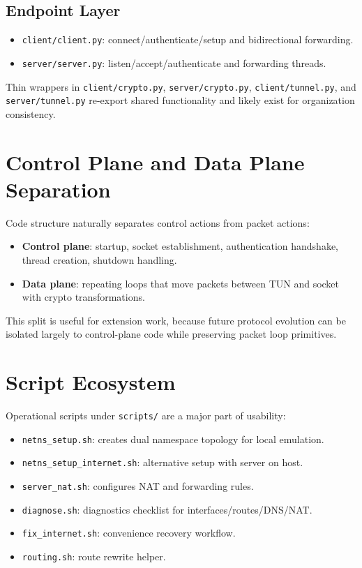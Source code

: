 \subsection{Endpoint Layer}
\begin{itemize}[leftmargin=2em]
\item \texttt{client/client.py}: connect/authenticate/setup and bidirectional forwarding.
\item \texttt{server/server.py}: listen/accept/authenticate and forwarding threads.
\end{itemize}

Thin wrappers in \texttt{client/crypto.py}, \texttt{server/crypto.py}, \texttt{client/tunnel.py}, and \texttt{server/tunnel.py} re-export shared functionality and likely exist for organization consistency.

\section{Control Plane and Data Plane Separation}
Code structure naturally separates control actions from packet actions:

\begin{itemize}[leftmargin=2em]
\item \textbf{Control plane}: startup, socket establishment, authentication handshake, thread creation, shutdown handling.
\item \textbf{Data plane}: repeating loops that move packets between TUN and socket with crypto transformations.
\end{itemize}

This split is useful for extension work, because future protocol evolution can be isolated largely to control-plane code while preserving packet loop primitives.

\section{Script Ecosystem}
Operational scripts under \texttt{scripts/} are a major part of usability:

\begin{itemize}[leftmargin=2em]
\item \texttt{netns\_setup.sh}: creates dual namespace topology for local emulation.
\item \texttt{netns\_setup\_internet.sh}: alternative setup with server on host.
\item \texttt{server\_nat.sh}: configures NAT and forwarding rules.
\item \texttt{diagnose.sh}: diagnostics checklist for interfaces/routes/DNS/NAT.
\item \texttt{fix\_internet.sh}: convenience recovery workflow.
\item \texttt{routing.sh}: route rewrite helper.
\end{itemize}

